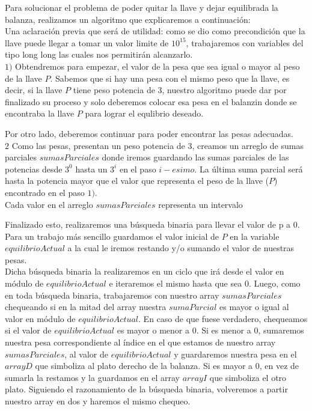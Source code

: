 
Para solucionar el problema de poder quitar la llave y dejar equilibrada la balanza, realizamos un algoritmo que explicaremos a continuaci\'on:\\

Una aclaraci\'on previa que ser\'a de utilidad: como se dio como precondici\'on que la llave puede llegar a tomar un valor limite de $10^{15}$, trabajaremos con variables del tipo long long las cuales nos permitir\'an alcanzarlo.\\

$1)$ Obtendremos para empezar, el valor de la pesa que sea igual o mayor al peso de la llave $P$.
Sabemos que si hay una pesa con el mismo peso que la llave, es decir, si la llave $P$ tiene peso potencia de 3, nuestro algoritmo puede dar por finalizado su proceso y solo deberemos colocar esa pesa en el balanzin donde se encontraba la llave $P$ para lograr el equlibrio deseado.

Por otro lado, deberemos continuar para poder encontrar las pesas adecuadas.\\

$2$ Como las pesas, presentan un peso potencia de 3, creamos un arreglo de sumas parciales $sumasParciales$ donde iremos guardando las sumas parciales de las potencias desde $3^0$ hasta un $3^i$ en el paso $i-esimo$. La última suma parcial será hasta la potencia mayor que el valor que representa el peso de la llave ($P$) encontrado en el paso $1)$.\\

Cada valor en el arreglo $sumasParciales$ representa un intervalo 

Finalizado esto, realizaremos una b\'usqueda binaria para llevar el valor de p a 0. Para un trabajo m\'as sencillo guardamos el valor inicial de $P$ en la variable $equilibrioActual$ a la cual le iremos restando y/o sumando el valor de nuestras pesas.\\

Dicha b\'usqueda binaria la realizaremos en un ciclo que ir\'a desde el valor en m\'odulo de $equilibrioActual$ e iteraremos el mismo hasta que sea 0. Luego, como en toda b\'usqueda binaria, trabajaremos con nuestro array $sumasParciales$ chequeando si en la mitad del array nuestra $sumaParcial$ es mayor o igual al valor en m\'odulo de $equilibrioActual$. En caso de que fuese verdadero, chequeamos si el valor de $equilibrioActual$ es mayor o menor a 0. Si es menor a 0, sumaremos nuestra pesa correspondiente al \'indice en el que estamos de nuestro array $sumasParciales$, al valor de $equilibrioActual$ y guardaremos nuestra pesa en el $arrayD$ que simboliza al plato derecho de la balanza. Si es mayor a 0, en vez de sumarla la restamos y la guardamos en el array $arrayI$ que simboliza el otro plato. Siguiendo el razonamiento de la b\'usqueda binaria, volveremos a partir nuestro array en dos y haremos el mismo chequeo.\\

